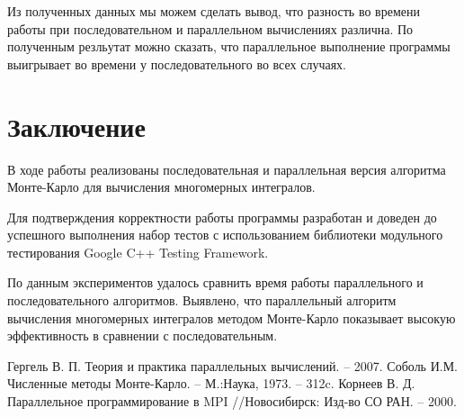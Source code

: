 \documentclass{report}
\begin{document}
\par Из полученных данных мы можем сделать вывод, что разность во времени работы при последовательном и параллельном вычислениях различна. По полученным резльутат можно сказать, что параллельное выполнение программы выигрывает во времени у последовательного во всех случаях.
\newpage

\section*{Заключение}
В ходе работы реализованы последовательная и параллельная версия алгоритма Монте-Карло для вычисления многомерных интегралов.
\par Для подтверждения корректности работы программы разработан и доведен до успешного
выполнения набор тестов с использованием библиотеки модульного тестирования Google C++
Testing Framework.
\par По данным экспериментов удалось сравнить время работы параллельного и последовательного
алгоритмов. Выявлено, что параллельный алгоритм вычисления многомерных интегралов методом Монте-Карло показывает высокую эффективность в сравнении с последовательным.
\newpage

\begin{thebibliography}{1}
Гергель В. П. Теория и практика параллельных вычислений. – 2007. 
Соболь И.М. Численные методы Монте-Карло. – М.:Наука, 1973. – 312c.
Корнеев В. Д. Параллельное программирование в MPI //Новосибирск: Изд-во СО РАН. – 2000.
\end{thebibliography}
\newpage

\end{document}
